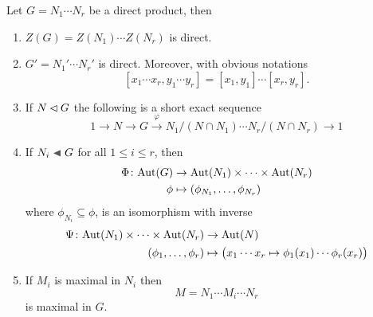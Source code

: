 \begin{prop}\label{product-center-and-maximal}
    Let\/ $G=N_1\cdots N_r$ be a direct product, then
    \begin{enumerate}[\upshape a)]
        \item  $Z(G)=Z(N_1)\cdots Z(N_r)$ is direct.
        \item $G'=N_1'\cdots N_r'$ is direct. Moreover, with obvious notations
        \begin{equation}\label{eq:commutator-distribution}
            [x_1\cdots x_r,y_1\cdots y_r]=[x_1,y_1]\cdots[x_r,y_r].
        \end{equation}
        \item If\/ $N\lhd G$ the following is a short exact sequence
        $$
            1\to N\to G\stackrel{\varphi}{\to} N_1/(N\cap N_1)\cdots N_r/(N\cap N_r)\to1
        $$
        \item If\/ $N_i\ch G$ for all\/ $1\le i\le r$, then
        \begin{align*}
            \Phi\colon{\rm Aut}(G) &\to {\rm Aut}(N_1)\times\cdots\times{\rm Aut}(N_r)\\
            \phi&\mapsto(\phi_{N_1},\dots,\phi_{N_r})
        \end{align*}
        where $\phi_{N_i}\subseteq\phi$, is an isomorphism with inverse
        \begin{align*}
            \Psi\colon{\rm Aut}(N_1)\times\cdots\times{\rm Aut}(N_r)&\to{\rm Aut}(N)\\
            (\phi_1,\dots,\phi_r)&\mapsto\big(x_1\cdots x_r\mapsto
                \phi_1(x_1)\cdots\phi_r(x_r)\big)
        \end{align*}
        \item If\/ $M_i$ is maximal in\/ $N_i$ then 
        $$
            M = N_1\cdots M_i\cdots N_r
        $$
        is maximal in\/ $G$.
    \end{enumerate}
\end{prop}

